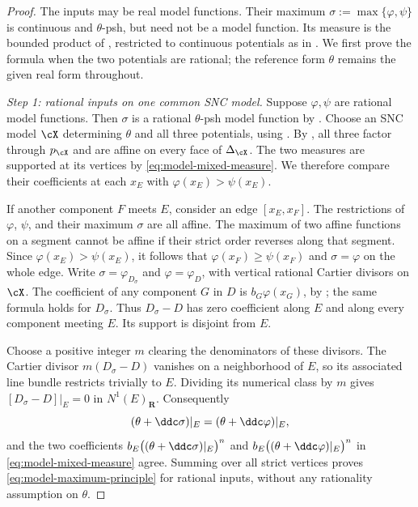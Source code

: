 \begin{proof}
The inputs may be real model functions.  Their maximum
\(\sigma:=\max\{\varphi,\psi\}\) is continuous and \(\theta\)-psh,
but need not be a model function.  Its measure is the bounded product of
, restricted to continuous potentials as
in .  We first prove the formula when
the two potentials are rational; the reference form \(\theta\) remains
the given real form throughout.

\emph{Step 1: rational inputs on one common SNC model.}
Suppose \(\varphi,\psi\) are rational model functions.  Then \(\sigma\)
is a rational \(\theta\)-psh model function by
.  Choose an SNC model \(\cX\) determining
\(\theta\) and all three potentials, using .
By , all three factor through
\(p_{\cX}\) and are affine on every face of \(\Delta_{\cX}\).
The two measures are supported at its vertices by
\eqref{eq:model-mixed-measure}.  We therefore compare their coefficients
at each \(x_E\) with \(\varphi(x_E)>\psi(x_E)\).

If another component \(F\) meets \(E\), consider an edge
\([x_E,x_F]\).  The restrictions of \(\varphi\), \(\psi\), and their
maximum \(\sigma\) are all affine.  The maximum of two affine functions
on a segment cannot be affine if their strict order reverses along that
segment.  Since \(\varphi(x_E)>\psi(x_E)\), it follows that
\(\varphi(x_F)\geq\psi(x_F)\) and \(\sigma=\varphi\) on the whole
edge.  Write \(\sigma=\varphi_{D_\sigma}\) and
\(\varphi=\varphi_D\), with vertical rational Cartier divisors on
\(\cX\).  The coefficient of any component \(G\) in \(D\) is
\(b_G\varphi(x_G)\), by
; the same formula holds for
\(D_\sigma\).  Thus \(D_\sigma-D\) has zero coefficient along \(E\)
and along every component meeting \(E\).  Its support is disjoint from
\(E\).

Choose a positive integer \(m\) clearing the denominators of these
divisors.  The Cartier divisor \(m(D_\sigma-D)\) vanishes on a
neighborhood of \(E\), so its associated line bundle restricts trivially
to \(E\).  Dividing its numerical class by \(m\) gives
\([D_\sigma-D]|_E=0\) in \(N^1(E)_{\mathbf R}\).  Consequently
\[
 (\theta+\ddc\sigma)|_E=(\theta+\ddc\varphi)|_E,
\]
and the two coefficients
\(b_E\bigl((\theta+\ddc\sigma)|_E\bigr)^n\) and
\(b_E\bigl((\theta+\ddc\varphi)|_E\bigr)^n\) in
\eqref{eq:model-mixed-measure} agree.  Summing over all strict vertices
proves \eqref{eq:model-maximum-principle} for rational inputs, without
any rationality assumption on \(\theta\).


\end{proof}
